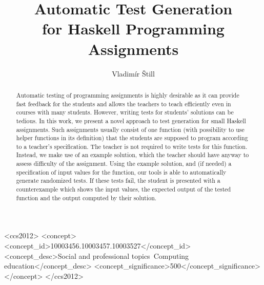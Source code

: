 \documentclass[sigconf,screen]{acmart} %
\begin{document}
\title{Automatic Test Generation\\ for Haskell Programming Assignments}

\author{Vladimír Štill}

\begin{abstract}
    Automatic testing of programming assignments is highly desirable as it can
    provide fast feedback for the students and allows the teachers to teach
    efficiently even in courses with many students.
    However, writing tests for students' solutions can be tedious.
    In this work, we present a novel approach to test generation for small Haskell
    assignments.
    Such assignments usually consist of one function (with possibility to use
    helper functions in its definition) that the students are supposed to program
    according to a teacher's specification.
    The teacher is not required to write tests for this function.
    Instead, we make use of an example solution, which the teacher should have
    anyway to assess difficulty of the assignment.
    Using the example solution, and (if needed) a specification of input values for
    the function, our tools is able to automatically generate randomized tests.
    If these tests fail, the student is presented with a counterexample which
    shows the input values, the expected output of the tested function and the
    output computed by their solution.
\end{abstract}

\begin{CCSXML}
<ccs2012>
    <concept>
        <concept_id>10003456.10003457.10003527</concept_id>
        <concept_desc>Social and professional topics~Computing education</concept_desc>
        <concept_significance>500</concept_significance>
    </concept>
</ccs2012>
\end{CCSXML}

\end{document}

